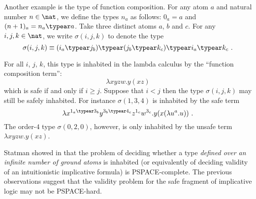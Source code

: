 Another example is the type of function composition. For any atom
$a$ and natural number $n\in\nat$, we define the types $n_a$ as
follows: $0_a = a$ and $(n+1)_a = n_a \typear a$. Take three
distinct atoms $a$, $b$ and $c$. For any $i,j,k\in\nat$, we write
$\sigma(i,j,k)$ to denote the type
$$\sigma(i,j,k) \equiv (i_a \typear j_b) \typear (j_b \typear k_c) \typear i_a \typear
k_c \ .$$

For all $i$, $j$, $k$, this type is inhabited in the lambda calculus
by the ``function composition term'':
$$\lambda x y z w . y (x z) $$
which is safe if and only if $i\geq j$. Suppose that $i<j$ then the type
$\sigma(i,j,k)$ may still be safely inhabited. For instance
$\sigma(1,3,4)$ is inhabited by the safe term
$$ \lambda x^{1_a \typear 3_b} y^{3_b \typear 4_c} z^{1_c} w^{3_c} . y (x (\lambda u^a . u)) \ .$$
The order-$4$ type $\sigma(0,2,0)$, however, is only inhabited by the unsafe term $\lambda x y z w. y (x z) $.


Statman showed in \cite{Statman1979} that the problem of deciding
whether a type \emph{defined over an infinite number of ground
atoms} is inhabited (or equivalently of deciding validity of an
intuitionistic implicative formula) is PSPACE-complete. The previous
observations suggest that the validity problem for the safe fragment
of implicative logic may not be PSPACE-hard.
